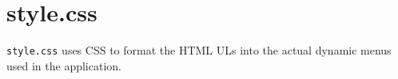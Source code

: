 \section{style.css}

\verb|style.css| uses CSS to format the HTML ULs into the actual dynamic menus used in
the application.


